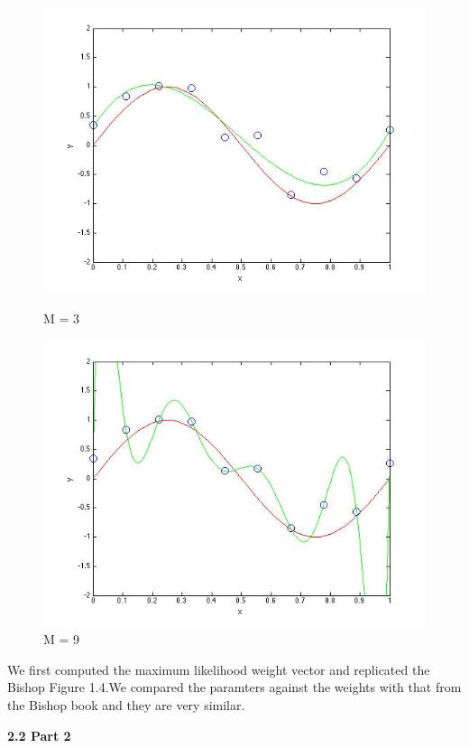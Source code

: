 \begin{figure}[!htb]
  \includegraphics[width=\linewidth]{figures/p2_MLE_M=3}
  \caption{M = 3}\label{fig:figures/p2_M=3}
\endminipage\hfill
{}                                                                            
  \includegraphics[width=\linewidth]{figures/p2_MLE_M=9}
  \caption{M = 9}\label{fig:figures/p2_M=9}
\endminipage\hfill
\end{figure}

We first computed the maximum likelihood weight vector and replicated 
the Bishop Figure 1.4.We compared the paramters against the weights with that from the Bishop book and they are very similar. 



{\bfseries 2.2 Part 2}

